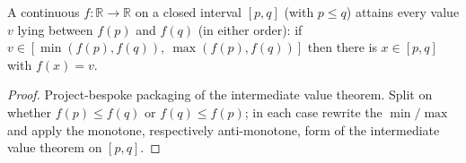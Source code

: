 \begin{lemma}

  \label{lem:ivt_hits}
  A continuous $f : \mathbb{R} \to \mathbb{R}$ on a closed interval $[p, q]$
  (with $p \le q$) attains every value $v$ lying between $f(p)$ and $f(q)$ (in
  either order): if $v \in [\min(f(p), f(q)),\ \max(f(p), f(q))]$ then there is
  $x \in [p, q]$ with $f(x) = v$.
\end{lemma}
\begin{proof}

\leanok
  Project-bespoke packaging of the intermediate value theorem. Split on whether
  $f(p) \le f(q)$ or $f(q) \le f(p)$; in each case rewrite the $\min/\max$ and
  apply the monotone, respectively anti-monotone, form of the intermediate value
  theorem on $[p, q]$.
\end{proof}

